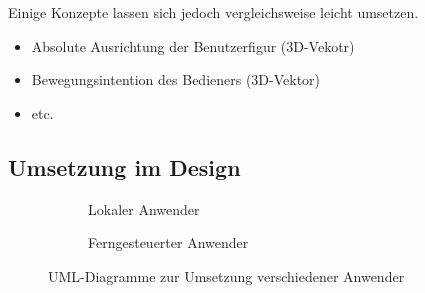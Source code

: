 Einige Konzepte lassen sich jedoch vergleichsweise leicht umsetzen.
\begin{itemize}
\item Absolute Ausrichtung der Benutzerfigur (3D-Vekotr)
\item Bewegungsintention des Bedieners (3D-Vektor)
\item etc.
\end{itemize}

\subsection{Umsetzung im Design}

\begin{figure}
\centering
\begin{subfigure}[b]{0.3\textwidth}
\centering
{}
\caption{Lokaler Anwender}
\label{fig:local}

\end{subfigure}
\begin{subfigure}[b]{0.3\textwidth}
\centering
{}
\caption{Ferngesteuerter Anwender}
\label{fig:remotecontrol_indiv}
\end{subfigure}
\caption{UML-Diagramme zur Umsetzung verschiedener Anwender}
\label{fig:remotecontrol_design}
\end{figure}

